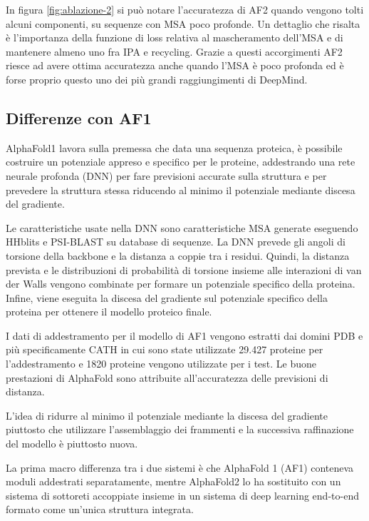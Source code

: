 \par In figura \ref{fig:ablazione-2} si può notare l'accuratezza di AF2 quando vengono tolti alcuni componenti, su sequenze con MSA poco profonde. Un dettaglio che risalta è l'importanza della funzione di loss relativa al mascheramento dell'MSA e di mantenere almeno uno fra IPA e recycling. Grazie a questi accorgimenti AF2 riesce ad avere ottima accuratezza anche quando l'MSA è poco profonda ed è forse proprio questo uno dei più grandi raggiungimenti di DeepMind.


\subsection{Differenze con AF1}

AlphaFold1 lavora sulla premessa che data una sequenza proteica, è possibile costruire un potenziale appreso e specifico per le proteine, addestrando una rete neurale profonda (DNN) per fare previsioni accurate sulla struttura e per prevedere la struttura stessa riducendo al minimo il potenziale mediante discesa del gradiente.

\par Le caratteristiche usate nella DNN sono caratteristiche MSA generate eseguendo HHblits e PSI-BLAST su database di sequenze. La DNN prevede gli angoli di torsione della backbone e la distanza a coppie tra i residui. Quindi, la distanza prevista e le distribuzioni di probabilità di torsione insieme alle interazioni di  van der Walls vengono combinate per formare un potenziale specifico della proteina. Infine, viene eseguita la discesa del gradiente sul potenziale specifico della proteina per ottenere il modello proteico finale. 

\par I dati di addestramento per il modello di AF1 vengono estratti dai domini PDB e più specificamente CATH in cui sono state utilizzate 29.427 proteine ​​per l'addestramento e 1820 proteine ​​vengono utilizzate per i test. Le buone prestazioni di AlphaFold sono attribuite all'accuratezza delle previsioni di distanza\supercite{pakhrin2021deep}.

\par L'idea di ridurre al minimo il potenziale mediante la discesa del gradiente piuttosto che utilizzare l'assemblaggio dei frammenti e la successiva raffinazione del modello è piuttosto nuova.

\par La prima macro differenza tra i due sistemi è che AlphaFold 1 (AF1) conteneva moduli addestrati separatamente, mentre AlphaFold2 lo ha sostituito con un sistema di sottoreti accoppiate insieme in un sistema di deep learning end-to-end formato come un'unica struttura integrata.

